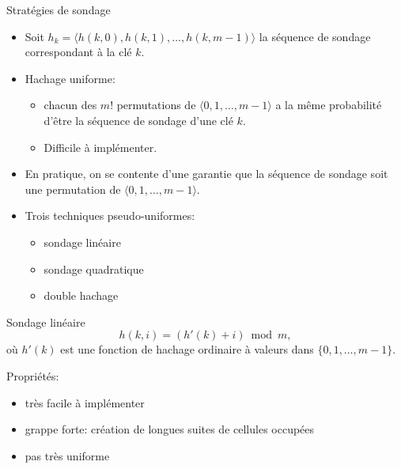 \begin{frame}{Stratégies de sondage}
\begin{itemize}
\item Soit $h_k=\langle h(k,0), h(k,1), \ldots, h(k,m-1)\rangle$ la séquence de sondage correspondant à la clé $k$.
\item Hachage uniforme:
\begin{itemize}
\item chacun des $m!$ permutations de $\langle
  0,1,\ldots,m-1\rangle$ a la même probabilité d'être la séquence de
  sondage d'une clé $k$.
\item Difficile à implémenter.
\end{itemize}
\item En pratique, on se contente d'une garantie que la séquence de
  sondage soit une permutation de $\langle
  0,1,\ldots,m-1\rangle$.

\bigskip

\item Trois techniques pseudo-uniformes:
\begin{itemize}
\item sondage linéaire
\item sondage quadratique
\item double hachage
\end{itemize}
\end{itemize}

\end{frame}

\begin{frame}{Sondage linéaire}
$$h(k,i)=(h'(k)+i) \bmod m,$$
où $h'(k)$ est une fonction de hachage ordinaire à valeurs dans $\{0,1,\ldots,m-1\}$.

\bigskip

Propriétés:
\begin{itemize}
\item très facile à implémenter
\item grappe forte: création de longues suites de cellules occupées
\item pas très uniforme
\end{itemize}


\end{frame}

